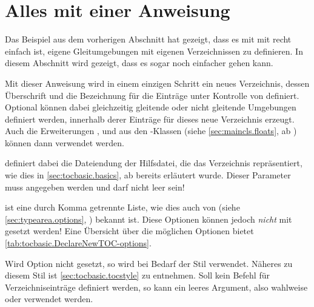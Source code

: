 \section{Alles mit einer Anweisung}

Das Beispiel aus dem vorherigen Abschnitt hat gezeigt, dass es mit mit
 recht einfach ist, eigene Gleitumgebungen mit eigenen
Verzeichnissen zu definieren. In diesem Abschnitt wird gezeigt, dass es sogar
noch einfacher gehen kann.

\begin{Declaration}
\end{Declaration}%
Mit dieser Anweisung wird in einem
einzigen Schritt ein neues Verzeichnis, dessen Überschrift und die Bezeichnung
für die Einträge unter Kontrolle von  definiert. Optional
können dabei gleichzeitig gleitende oder nicht gleitende Umgebungen definiert
werden, innerhalb derer %
 Einträge für
dieses neue Verzeichnis erzeugt. Auch die Erweiterungen
,  und
 aus den \KOMAScript-Klassen (siehe
\autoref{sec:maincls.floats}, ab )
können dann verwendet werden.

 definiert dabei die Dateiendung der Hilfsdatei, die
das Verzeichnis repräsentiert, wie dies in \autoref{sec:tocbasic.basics}, ab
 bereits erläutert
wurde. Dieser Parameter muss angegeben werden und darf
nicht leer sein!

 ist eine durch Komma getrennte Liste, wie dies auch von
 (siehe \autoref{sec:typearea.options},
) bekannt ist. Diese
Optionen können jedoch \emph{nicht} mit
 gesetzt werden! Eine
Übersicht über die möglichen Optionen bietet
\autoref{tab:tocbasic.DeclareNewTOC-options}\iffalse ab
\autopageref{tab:tocbasic.DeclareNewTOC-options}\fi.

Wird Option
 nicht gesetzt, so wird bei Bedarf der Stil
 verwendet. Näheres zu diesem Stil ist
\autoref{sec:tocbasic.tocstyle} zu entnehmen. Soll kein Befehl für
Verzeichniseinträge definiert werden, so kann ein leeres Argument, also
wahlweise \iffree{}{\unskip} oder
 verwendet werden.

